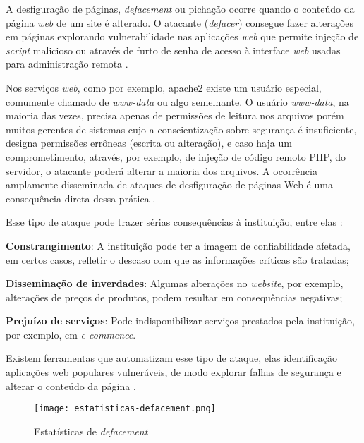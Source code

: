 A desfiguração de páginas, \textit{defacement} ou pichação ocorre quando o conteúdo da página \textit{web} de um site é alterado. O atacante (\textit{defacer}) consegue fazer alterações em páginas explorando vulnerabilidade nas aplicações \textit{web} que permite injeção de \textit{script} malicioso ou através de furto de senha de acesso à interface \textit{web} usadas para administração remota \cite{certs-ataques}.

Nos serviços \textit{web}, como por exemplo, apache2 existe um usuário especial, comumente chamado de \textit{www-data} ou algo semelhante. O usuário \textit{www-data}, na maioria das vezes, precisa apenas de permissões de leitura nos arquivos porém muitos gerentes de sistemas cujo a conscientização sobre segurança é insuficiente, designa permissões errôneas (escrita ou alteração), e caso haja um comprometimento, através, por exemplo, de injeção de código remoto PHP, do servidor, o atacante poderá alterar a maioria dos arquivos. A ocorrência amplamente disseminada de ataques de desfiguração de páginas Web é uma consequência direta dessa prática \cite{seguranca:william-lawrie}.

Esse tipo de ataque pode trazer sérias consequências à instituição, entre elas \cite{esr:tratamento}:

\begin{alineas}
\item \textbf{Constrangimento}: A instituição pode ter a imagem de confiabilidade afetada, em certos casos, refletir o descaso com que as informações críticas são tratadas; 
\item \textbf{Disseminação de inverdades}: Algumas alterações no \textit{website}, por exemplo, alterações de preços de produtos, podem resultar em consequências negativas; 
\item \textbf{Prejuízo de serviços}: Pode indisponibilizar serviços prestados pela instituição, por exemplo, em \textit{e-commence}.
\end{alineas}

Existem ferramentas que automatizam esse tipo de ataque, elas identificação aplicações web populares vulneráveis, de modo explorar falhas de segurança e alterar o conteúdo da página \cite{esr:tratamento}.

\begin{figure}[!htb]
 \centering
 \caption{Estatísticas de \textit{defacement}}
 \texttt{[image: estatisticas-defacement.png]}
 \label{fig:estatistica-defacement}
\end{figure}


